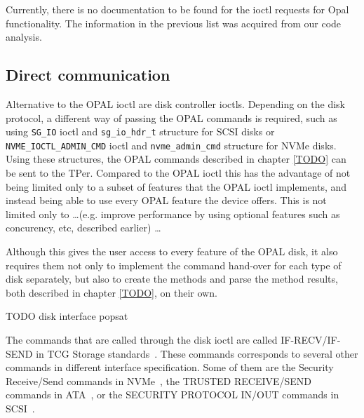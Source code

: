 Currently, there is no documentation to be found for the ioctl requests for Opal functionality. The information in the previous list was acquired from our code analysis.

\subsection{Direct communication}

Alternative to the OPAL ioctl are disk controller ioctls. Depending on the disk protocol, a different way of passing the OPAL commands is required, such as using \verb|SG_IO| ioctl and \verb|sg_io_hdr_t| structure for SCSI disks or \verb|NVME_IOCTL_ADMIN_CMD| ioctl and \verb|nvme_admin_cmd| structure for NVMe disks. Using these structures, the OPAL commands described in chapter \ref{TODO} can be sent to the TPer. Compared to the OPAL ioctl this has the advantage of not being limited only to a subset of features that the OPAL ioctl implements, and instead being able to use every OPAL feature the device offers. This is not limited only to \dots (e.g. improve performance by using optional features such as concurency, etc, described earlier) \dots

Although this gives the user access to every feature of the OPAL disk, it also requires them not only to implement the command hand-over for each type of disk separately, but also to create the methods and parse the method results, both described in chapter \ref{TODO}, on their own.

TODO disk interface popsat\cite{NVME}

The commands that are called through the disk ioctl are called IF-RECV/IF-SEND in TCG Storage standards~\cite{tcg-storage-core}. These commands corresponds to several other commands in different interface specification. Some of them are the Security Receive/Send commands in NVMe~\cite{nvme-express-base-specification}, the TRUSTED RECEIVE/SEND commands in ATA~\cite{acs-3}, or the SECURITY PROTOCOL IN/OUT commands in SCSI~\cite{spc-4}.


